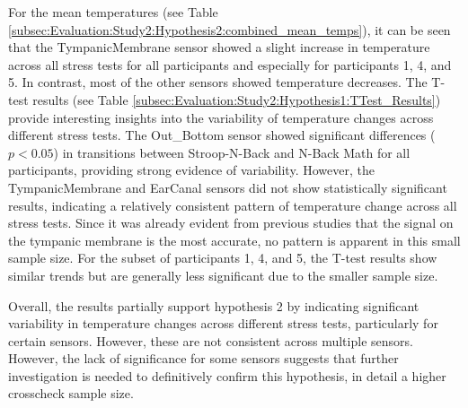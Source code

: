 For the mean temperatures (see Table \ref{subsec:Evaluation:Study2:Hypothesis2:combined_mean_temps}), it can be seen that the TympanicMembrane sensor showed a slight increase in temperature across all stress tests for all participants and especially for participants 1, 4, and 5. In contrast, most of the other sensors showed temperature decreases.
The T-test results (see Table \ref{subsec:Evaluation:Study2:Hypothesis1:TTest_Results}) provide interesting insights into the variability of temperature changes across different stress tests. 
The Out\_Bottom sensor showed significant differences ($p<0.05$) in transitions between Stroop-N-Back and N-Back Math for all participants, providing strong evidence of variability. 
However, the TympanicMembrane and EarCanal sensors did not show statistically significant results, indicating a relatively consistent pattern of temperature change across all stress tests.
Since it was already evident from previous studies that the signal on the tympanic membrane is the most accurate, no pattern is apparent in this small sample size.
For the subset of participants 1, 4, and 5, the T-test results show similar trends but are generally less significant due to the smaller sample size.

Overall, the results partially support hypothesis 2 by indicating significant variability in temperature changes across different stress tests, particularly for certain sensors. 
However, these are not consistent across multiple sensors. 
However, the lack of significance for some sensors suggests that further investigation is needed to definitively confirm this hypothesis, in detail a higher crosscheck sample size.

